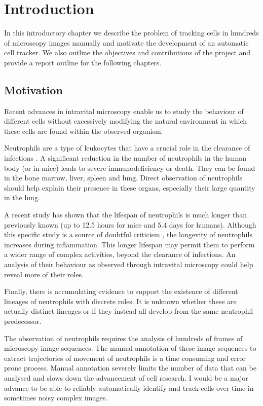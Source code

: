 	\chapter{Introduction \statusfirstdraft}


	In this introductory chapter we describe the problem of tracking cells in hundreds of microscopy images manually and motivate the development of an automatic cell tracker. We also outline the objectives and contributions of the project and provide a report outline for the following chapters.
	
	\section{Motivation \statusfirstdraft}
		
		Recent advances in intravital microscopy enable us to study the behaviour of different cells without excessively modifying the natural environment in which these cells are found within the observed organism. 
			
		Neutrophils are a type of leukocytes that have a crucial role in the clearance of infections \cite{kolku13}. A significant reduction in the number of neutrophils in the human body (or in mice) leads to severe immunodeficiency or death. They can be found in the bone marrow, liver, spleen and lung. Direct observation of neutrophils should help explain their presence in these organs, especially their large quantity in the lung.
		
		A recent study \cite{pillay10} has shown that the lifespan of neutrophils is much longer than previously known (up to 12.5 hours for mice and 5.4 days for humans). Although this specific study is a source of doubtful criticism \cite{toft11}, the longevity of neutrophils increases during inflammation. This longer lifespan may permit them to perform a wider range of complex activities, beyond the clearance of infections. An analysis of their behaviour as observed through intravital microscopy could help reveal more of their roles.
		
		Finally, there is accumulating evidence to support the existence of different lineages of neutrophils with discrete roles. It is unknown whether these are actually distinct lineages or if they instead all develop from the same neutrophil predecessor.
		
		The observation of neutrophils requires the analysis of hundreds of frames of microscopy image sequences. The manual annotation of these image sequences to extract trajectories of movement of neutrophils is a time consuming and error prone process. Manual annotation severely limits the number of data that can be analysed and slows down the advancement of cell research. I would be a major advance to be able to reliably automatically identify and track cells over time in sometimes noisy complex images.
		
